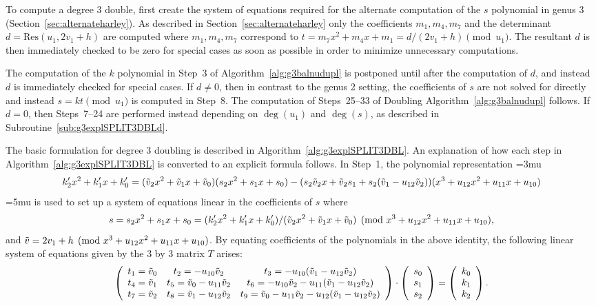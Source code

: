 To compute a degree 3 double, first create the system of equations required for the
alternate computation of the $s$ polynomial in genus 3
(Section~\ref{sec:alternateharley}). As described in
Section~\ref{sec:alternateharley} only the coefficients $m_1,m_4,m_7$ and the
determinant $d = \mathrm{Res}(u_1,2v_1+h)$ are computed where $m_1,m_4,m_7$
correspond to $t = m_7x^2 + m_4x + m_1 = d/(2v_1 + h) \pmod{u_1}$. The resultant
$d$ is then immediately checked to be zero for special cases as soon as possible
in order to minimize unnecessary computations.


The computation of the $k$ polynomial in Step~3 of
Algorithm~\ref{alg:g3balnudupl} is postponed until after the computation of $d$,
and instead $d$ is immediately checked for special cases. If $d \neq 0$, then in
contrast to the genus 2 setting, the coefficients of $s$ are not solved for
directly and instead $s = kt \pmod{u_1}$ is computed in Step~8. The computation
of Steps~25--33 of Doubling Algorithm~\ref{alg:g3balnudupl} follows. If $d = 0$,
then Steps~7--24 are performed instead depending on $\deg(u_1)$ and $\deg(s)$, as
described in Subroutine~\ref{sub:g3explSPLIT3DBLd}. 

The basic formulation for degree 3 doubling is described in
Algorithm~\ref{alg:g3explSPLIT3DBL}. An explanation of how each step in
Algorithm~\ref{alg:g3explSPLIT3DBL} is converted to an explicit formula follows.
In Step~1, the polynomial representation \thickmuskip=3mu $$k'_2x^2 + k'_1x + k'_0 = (\tilde{v}_2x^2 +
\tilde{v}_1x + \tilde{v}_0)(s_2x^2 + s_1x + s_0) - (s_2\tilde{v}_2x + \tilde{v}_2s_1 + s_2(\tilde{v}_1 -
u_{12}\tilde{v}_2))(x^3 + u_{12}x^2 + u_{11}x + u_{10})$$ \thickmuskip=5mu is used to set up a system
of equations linear in the coefficients of $s$ where
$$s = s_2x^2 + s_1x + s_0 = (k'_2x^2 + k'_1x + k'_0)/(\tilde{v}_2x^2 + \tilde{v}_1x + \tilde{v}_0)
\pmod{x^3 + u_{12}x^2 + u_{11}x + u_{10}},$$ and $\tilde{v} = 2v_1 + h \pmod{x^3 +
u_{12}x^2 + u_{11}x + u_{10}}$. By equating coefficients of the polynomials in
the above identity, the following linear system of equations given by the 3 by 3
matrix $T$ arises: $$ \left(
\begin{array}{ccc} 
 t_1 = \tilde{v}_0 & t_2 = -u_{10}\tilde{v}_2        & t_3 = -u_{10}(\tilde{v}_1 - u_{12}\tilde{v}_2)  \\
 t_4 = \tilde{v}_1 & t_5 = \tilde{v}_0 - u_{11}\tilde{v}_2 & t_6 = -u_{10}\tilde{v}_2 - u_{11}(\tilde{v}_1 - u_{12}\tilde{v}_2)  \\
 t_7 = \tilde{v}_2 & t_8 = \tilde{v}_1 - u_{12}\tilde{v}_2 & t_9 = \tilde{v}_0 - u_{11}\tilde{v}_2 - u_{12}(\tilde{v}_1 - u_{12}\tilde{v}_2)  
\end{array} \right) \cdot 
\left( \begin{array}{c}
s_0  \\
s_1   \\
s_2   \end{array} \right) = 
\left( \begin{array}{c}
k_0  \\
k_1   \\
k_2   \end{array} \right).$$ 

